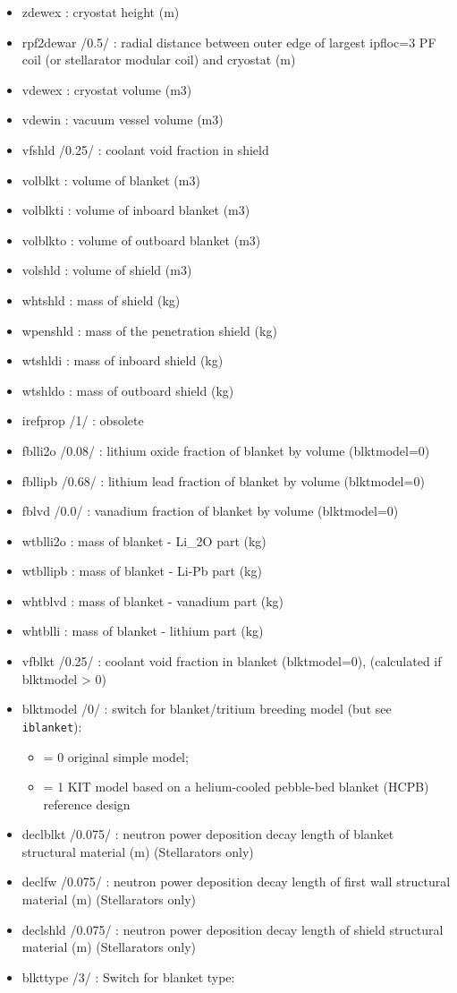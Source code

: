 \documentclass[]{article}
\providecommand{\tightlist}{%
  \setlength{\itemsep}{0pt}\setlength{\parskip}{0pt}}
\begin{document}
\begin{itemize}
\item
  zdewex : cryostat height (m)
\item
  rpf2dewar /0.5/ : radial distance between outer edge of largest
  ipfloc=3 PF coil (or stellarator modular coil) and cryostat (m)
\item
  vdewex : cryostat volume (m3)
\item
  vdewin : vacuum vessel volume (m3)
\item
  vfshld /0.25/ : coolant void fraction in shield
\item
  volblkt : volume of blanket (m3)
\item
  volblkti : volume of inboard blanket (m3)
\item
  volblkto : volume of outboard blanket (m3)
\item
  volshld : volume of shield (m3)
\item
  whtshld : mass of shield (kg)
\item
  wpenshld : mass of the penetration shield (kg)
\item
  wtshldi : mass of inboard shield (kg)
\item
  wtshldo : mass of outboard shield (kg)
\item
  irefprop /1/ : obsolete
\item
  fblli2o /0.08/ : lithium oxide fraction of blanket by volume
  (blktmodel=0)
\item
  fbllipb /0.68/ : lithium lead fraction of blanket by volume
  (blktmodel=0)
\item
  fblvd /0.0/ : vanadium fraction of blanket by volume (blktmodel=0)
\item
  wtblli2o : mass of blanket - Li\_2O part (kg)
\item
  wtbllipb : mass of blanket - Li-Pb part (kg)
\item
  whtblvd : mass of blanket - vanadium part (kg)
\item
  whtblli : mass of blanket - lithium part (kg)
\item
  vfblkt /0.25/ : coolant void fraction in blanket (blktmodel=0),
  (calculated if blktmodel \textgreater{} 0)
\item
  blktmodel /0/ : switch for blanket/tritium breeding model (but see
  \texttt{iblanket}):

  \begin{itemize}
  \tightlist
  \item
    = 0 original simple model;
  \item
    = 1 KIT model based on a helium-cooled pebble-bed blanket (HCPB)
    reference design
  \end{itemize}
\item
  declblkt /0.075/ : neutron power deposition decay length of blanket
  structural material (m) (Stellarators only)
\item
  declfw /0.075/ : neutron power deposition decay length of first wall
  structural material (m) (Stellarators only)
\item
  declshld /0.075/ : neutron power deposition decay length of shield
  structural material (m) (Stellarators only)
\item
  blkttype /3/ : Switch for blanket type:


\end{itemize}
\end{document}
